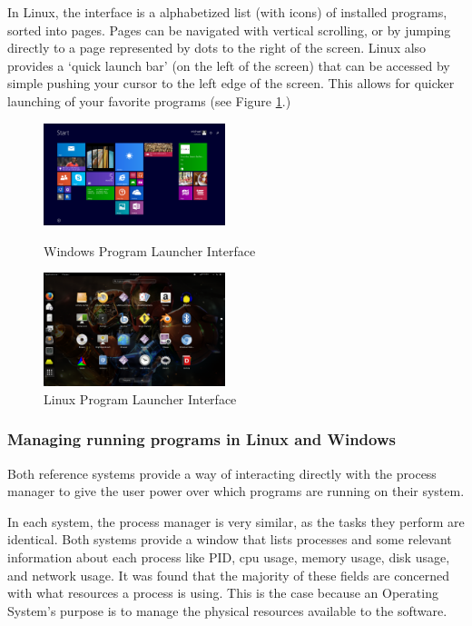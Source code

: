 \documentclass[a4paper]{report}
\begin{document}
In Linux, the interface is a alphabetized list (with icons) of installed programs, sorted into pages. Pages can be navigated with vertical scrolling, or by jumping directly to a page represented by dots to the right of the screen. Linux also provides a `quick launch bar' (on the left of the screen) that can be accessed by simple pushing your cursor to the left edge of the screen. This allows for quicker launching of your favorite programs (see Figure \ref{fig:LinLaunchScreen}.)


\begin{figure}[ht]
\centering
\begin{minipage}{.5\textwidth}
  \centering
  \includegraphics[width=200px]{images/Windows_Program_Launcher_Screenshot}
  \caption{Windows Program Launcher Interface}
  \label{fig:WinLaunchScreen}
\end{minipage}%
\begin{minipage}{.5\textwidth}
  \centering
  \includegraphics[width=200px]{images/Linux_Program_Launcher_Screenshot}
  \caption{Linux Program Launcher Interface}
  \label{fig:LinLaunchScreen}
\end{minipage}
\end{figure}


\subsubsection*{Managing running programs in Linux and Windows}

Both reference systems provide a way of interacting directly with the process manager to give the user power over which programs are running on their system.

In each system, the process manager is very similar, as the tasks they perform are identical. Both systems provide a window that lists processes and some relevant information about each process like PID, cpu usage, memory usage, disk usage, and network usage. It was found that the majority of these fields are concerned with what resources a process is using. This is the case because an Operating System's purpose is to manage the physical resources available to the software.
\end{document}
